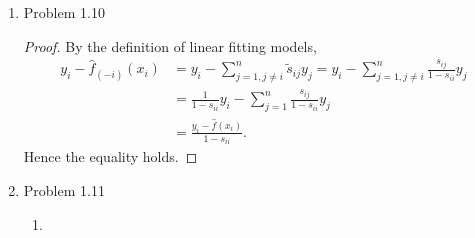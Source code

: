\documentclass{article}
\begin{document}
\begin{enumerate}
\begin{enumerate}
\item Show that $\lim_{\lambda\to 0^+}\frac{\partial}{\partial \lambda}\text{Bias}^2(\hat\beta) = 0 $.
\begin{proof}
First
$$
\text{MSE}(\hat\beta) = \sum \text{Var}(\hat\beta_j)+\sum\text{Bias}^2(\hat\beta_j).
$$
By (1.17) in https://arxiv.org/pdf/1509.09169;Lecture,
$$
\begin{aligned}
\text{MSE}(\hat\beta) = \sigma^2\text{tr}\{\frac{1}{n}QA^{-1}DA^{-1}Q^\top\} + \beta^\top Q(A^{-1}D-I)^\top (A^{-1}D-I)Q^\top\beta,
\end{aligned}
$$
where $A = D+\frac{1}{n}\lambda I$. By (a) we knowthe first term is just $\text{Var}(\hat\beta)$, so
$$
\begin{aligned}
\text{Bias}^2(\hat\beta) &= \beta^\top Q(A^{-1}D-I)^\top (A^{-1}D-I)Q^\top\beta \\
&= \alpha^\top\text{diag}\{\frac{\frac{1}{n^2}\lambda}{(d_i+\frac{1}{n}\lambda)^2}\}\alpha,
\end{aligned}
$$
where $\alpha = Q^\top\beta $. Then
$$
\begin{aligned}
\lim_{\lambda\to 0^+}\frac{\partial}{\partial\lambda}\text{Bias}^2(\hat\beta) = \lim_{\lambda\to 0^+} \alpha^\top\text{diag}\{\frac{\frac{2}{n^2}\lambda(d_i+\frac{1}{n}\lambda)^2-\frac{2}{n^3}\lambda^2(d_i+\frac{1}{n}\lambda)^2}{(d_i+\frac{1}{n}\lambda)^4}\}\alpha = 0.
\end{aligned}
$$

\end{proof}

\end{enumerate}

\item Problem 1.10
\begin{proof}
By the definition of linear fitting models,
$$
\begin{aligned}
y_i - \hat{f}_{(-i)}(x_i) &= y_i - \sum_{j=1, j\ne i}^{n}\tilde{s}_{ij}y_{j} = y_i - \sum_{j=1, j\ne i}^{n}\frac{s_{ij}}{1-s_{ii}}y_j \\
&= \frac{1}{1-s_{ii}}y_i -\sum_{j=1}^{n}\frac{s_{ij}}{1-s_{ii}}y_j \\
&= \frac{y_i - \hat{f}(x_i)}{1-s_{ii}}.
\end{aligned}
$$
Hence the equality holds.

\end{proof}

\item Problem 1.11

\begin{enumerate}
\item 

\end{enumerate}

\end{enumerate}
\end{document}
